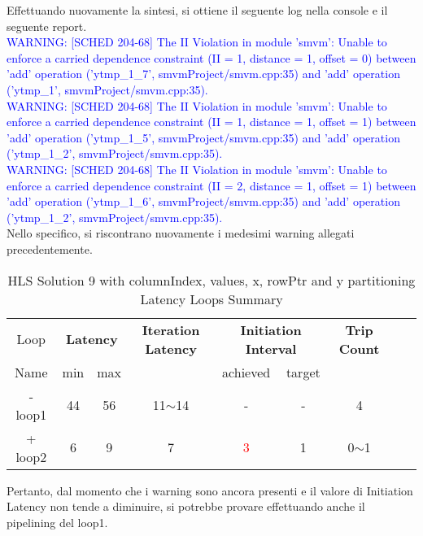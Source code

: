 

Effettuando nuovamente la sintesi, si ottiene il seguente log nella console e il seguente report.
\\
\textcolor{blue}{WARNING: [SCHED 204-68] The II Violation in module 'smvm': Unable to enforce a carried dependence constraint (II = 1, distance = 1, offset = 0)
	between 'add' operation ('ytmp\_1\_7', smvmProject/smvm.cpp:35) and 'add' operation ('ytmp\_1', smvmProject/smvm.cpp:35).}
\\
\textcolor{blue}{WARNING: [SCHED 204-68] The II Violation in module 'smvm': Unable to enforce a carried dependence constraint (II = 1, distance = 1, offset = 1)
	between 'add' operation ('ytmp\_1\_5', smvmProject/smvm.cpp:35) and 'add' operation ('ytmp\_1\_2', smvmProject/smvm.cpp:35).}
\\
\textcolor{blue}{WARNING: [SCHED 204-68] The II Violation in module 'smvm': Unable to enforce a carried dependence constraint (II = 2, distance = 1, offset = 1)
	between 'add' operation ('ytmp\_1\_6', smvmProject/smvm.cpp:35) and 'add' operation ('ytmp\_1\_2', smvmProject/smvm.cpp:35).}
\\
Nello specifico, si riscontrano nuovamente i medesimi warning allegati precedentemente.

\begin{table}[H]
	\centering
	\begin{tabular}{|c|c|c|c|c|c|c|c|c|}
		\hline
		\multicolumn{1}{|c|}{Loop} & \multicolumn{2}{|c|}{\textbf{Latency}} & \multicolumn{1}{c|}{\textbf{Iteration Latency}} & \multicolumn{2}{c|}{\textbf{Initiation Interval}} & \multicolumn{1}{c|}{\textbf{Trip Count}}  \\
		Name & min & max &  & achieved & target &  \\
		\hline
		- loop1 & 44 & 56 & 11$\sim$14 & - & - & 4 \\
		+ loop2 & 6 & 9 & 7 & \textcolor{red}{3} & 1 & 0$\sim$1 \\
		\hline
	\end{tabular}
	\caption{HLS Solution 9 with columnIndex, values, x, rowPtr and y partitioning Latency Loops Summary}
	\label{tab:hls-solution-9-columnindex-values-partitioning-loop-summary}
\end{table}

Pertanto, dal momento che i warning sono ancora presenti e il valore di Initiation Latency non tende a diminuire, si potrebbe provare effettuando anche il pipelining del loop1.

